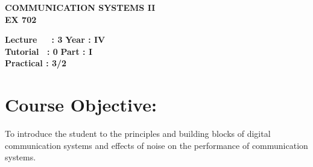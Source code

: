 \begin{center}
    \textbf{\huge{\uppercase{Communication Systems II}}}
    \\
    \vspace{.5cm}
    \textbf{\large{EX 702}}
\end{center}

\noindent\textbf{Lecture\ \ \ : 3} \hfill \textbf{Year : IV} \\
\textbf{Tutorial \ : 0} \hfill \textbf{Part : I } \\
\textbf{Practical : 3/2}  \\

\par
\noindent 
\section*{Course Objective:}
To introduce the student to the principles and building blocks of digital communication systems and effects of noise on the performance of communication systems.

